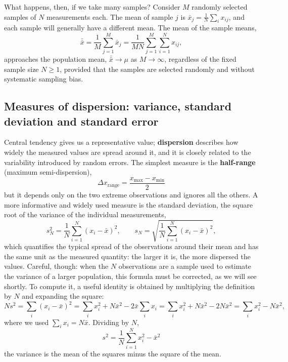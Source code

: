 \documentclass[letterpaper,11pt,leqno]{book}
\begin{document}
What happens, then, if we take many samples? Consider $M$ randomly selected samples of $N$ measurements each. The mean of sample $j$ is $\bar{x}_j = \frac{1}{N}\sum_i x_{ij}$, and each sample will generally have a different mean. The mean of the sample means,
\begin{equation}
\bar{\bar{x}} = \frac{1}{M}\sum_{j=1}^{M}\bar{x}_j = \frac{1}{MN}\sum_{j=1}^{M}\sum_{i=1}^{N}x_{ij},
\end{equation}
approaches the population mean, $\bar{\bar{x}} \to \mu$ as $M \to \infty$, regardless of the fixed sample size $N \ge 1$, provided that the samples are selected randomly and without systematic sampling bias.

\subsection{Measures of dispersion: variance, standard deviation and standard error}

Central tendency gives us a representative value; \textbf{dispersion} describes how widely the measured values are spread around it, and it is closely related to the variability introduced by random errors. The simplest measure is the \textbf{half-range} (maximum semi-dispersion),
\begin{equation}
\boxed{\Delta x_{\text{range}} = \frac{x_{\max} - x_{\min}}{2}}
\label{eq:half_range}
\end{equation}
but it depends only on the two extreme observations and ignores all the others. A more informative and widely used measure is the standard deviation, the square root of the variance of the individual measurements,
\begin{equation}
s_N^2 = \frac{1}{N}\sum_{i=1}^{N}(x_i - \bar{x})^2, \qquad s_N = \sqrt{\frac{1}{N}\sum_{i=1}^{N}(x_i - \bar{x})^2},
\label{eq:variance_N}
\end{equation}
which quantifies the typical spread of the observations around their mean and has the same unit as the measured quantity: the larger it is, the more dispersed the values. Careful, though: when the $N$ observations are a sample used to estimate the variance of a larger population, this formula must be corrected, as we will see shortly. To compute it, a useful identity is obtained by multiplying the definition by $N$ and expanding the square:
\begin{equation*}
Ns^2 = \sum_i(x_i - \bar{x})^2 = \sum_i x_i^2 + N\bar{x}^2 - 2\bar{x}\sum_i x_i = \sum_i x_i^2 + N\bar{x}^2 - 2N\bar{x}^2 = \sum_i x_i^2 - N\bar{x}^2,
\end{equation*}
where we used $\sum_i x_i = N\bar{x}$. Dividing by $N$,
\begin{equation}
\boxed{s^2 = \frac{1}{N}\sum_{i=1}^{N}x_i^2 - \bar{x}^2}
\label{eq:variance_identity}
\end{equation}
the variance is the mean of the squares minus the square of the mean.
\end{document}

